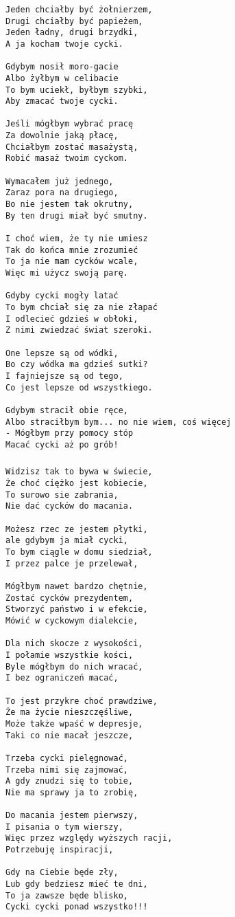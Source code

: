 \documentclass[12pt]{article}
\begin{document}
\subsubsection*{}
\begin{verbatim}
Jeden chciałby być żołnierzem,
Drugi chciałby być papieżem,
Jeden ładny, drugi brzydki,
A ja kocham twoje cycki.

Gdybym nosił moro-gacie
Albo żyłbym w celibacie
To bym uciekł, byłbym szybki,
Aby zmacać twoje cycki.

Jeśli mógłbym wybrać pracę
Za dowolnie jaką płacę,
Chciałbym zostać masażystą,
Robić masaż twoim cyckom.

Wymacałem już jednego,
Zaraz pora na drugiego,
Bo nie jestem tak okrutny,
By ten drugi miał być smutny.

I choć wiem, że ty nie umiesz
Tak do końca mnie zrozumieć
To ja nie mam cycków wcale,
Więc mi użycz swoją parę.

Gdyby cycki mogły latać
To bym chciał się za nie złapać
I odlecieć gdzieś w obłoki,
Z nimi zwiedzać świat szeroki.

One lepsze są od wódki,
Bo czy wódka ma gdzieś sutki?
I fajniejsze są od tego,
Co jest lepsze od wszystkiego.

Gdybym stracił obie ręce,
Albo straciłbym bym... no nie wiem, coś więcej
- Mógłbym przy pomocy stóp
Macać cycki aż po grób!
\end{verbatim}
\clearpage

\subsubsection*{}
\begin{verbatim}
Widzisz tak to bywa w świecie,
Że choć ciężko jest kobiecie,
To surowo sie zabrania,
Nie dać cycków do macania.

Możesz rzec ze jestem płytki,
ale gdybym ja miał cycki,
To bym ciągle w domu siedział,
I przez palce je przelewał,

Mógłbym nawet bardzo chętnie,
Zostać cycków prezydentem,
Stworzyć państwo i w efekcie,
Mówić w cyckowym dialekcie,

Dla nich skocze z wysokości,
I połamie wszystkie kości,
Byle mógłbym do nich wracać,
I bez ograniczeń macać,

To jest przykre choć prawdziwe,
Że ma życie nieszczęśliwe,
Może także wpaść w depresje,
Taki co nie macał jeszcze,

Trzeba cycki pielęgnować,
Trzeba nimi się zajmować,
A gdy znudzi się to tobie,
Nie ma sprawy ja to zrobię,

Do macania jestem pierwszy,
I pisania o tym wierszy,
Więc przez względy wyższych racji,
Potrzebuję inspiracji,

Gdy na Ciebie będe zły,
Lub gdy bedziesz mieć te dni,
To ja zawsze będe blisko,
Cycki cycki ponad wszystko!!!
\end{verbatim}
\clearpage
\end{document}
